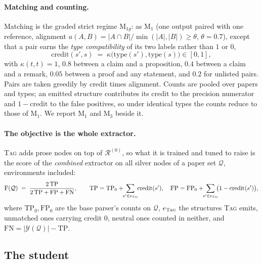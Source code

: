 \documentclass[10pt]{article}
\newcommand{\tagger}{\textsc{Tag}}
\begin{document}
\paragraph{Matching and counting.}
Matching is the graded strict regime $\mathrm{M}_{1g}$: as $\mathrm{M}_1$ (one output paired with one reference, alignment $a(A,B)=|A\cap B|/\min(|A|,|B|)\ge\theta$, $\theta=0.7$), except that a pair earns the \emph{type compatibility} of its two labels rather than $1$ or $0$,
%
\begin{equation}
  \mathrm{credit}(s',s) \;=\; \kappa\bigl(\mathrm{type}(s'),\mathrm{type}(s)\bigr)\in[0,1],
\end{equation}
%
with $\kappa(t,t)=1$, $0.8$ between a claim and a proposition, $0.4$ between a claim and a remark, $0.05$ between a proof and any statement, and $0.2$ for unlisted pairs. Pairs are taken greedily by credit times alignment. Counts are pooled over papers and types; an emitted structure contributes its credit to the precision numerator and $1-\mathrm{credit}$ to the false positives, so under identical types the counts reduce to those of $\mathrm{M}_1$. We report $\mathrm{M}_1$ and $\mathrm{M}_3$ beside it.

\paragraph{The objective is the whole extractor.}
\tagger{} adds prose nodes on top of $\mathcal{R}^{(0)}$, so what it is trained and tuned to raise is the score of the \emph{combined} extractor on all silver nodes of a paper set $\mathcal{Q}$, environments included:
%
\begin{equation}
  \mathrm{F}(\mathcal{Q})
  \;=\;
  \frac{2\,\mathrm{TP}}{2\,\mathrm{TP}+\mathrm{FP}+\mathrm{FN}},
  \qquad
  \mathrm{TP}=\mathrm{TP}_{0}+\!\!\sum_{s'\in e_{\tagger}}\!\!\mathrm{credit}(s'),\quad
  \mathrm{FP}=\mathrm{FP}_{0}+\!\!\sum_{s'\in e_{\tagger}}\!\!\bigl(1-\mathrm{credit}(s')\bigr),
  \label{eq:objective}
\end{equation}
%
where $\mathrm{TP}_0,\mathrm{FP}_0$ are the base parser's counts on $\mathcal{Q}$, $e_{\tagger}$ the structures \tagger{} emits, unmatched ones carrying credit $0$, neutral ones counted in neither, and $\mathrm{FN}=|\mathcal{Y}(\mathcal{Q})|-\mathrm{TP}$.

\subsection{The student}
\end{document}
